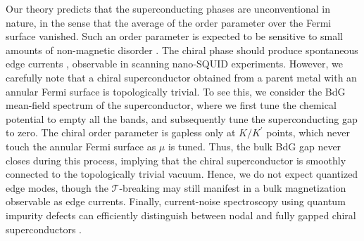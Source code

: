 \documentclass[aps,pra,twocolumn,superscriptaddress,10pt,article,nofootinbib,showpacs,longbibliography]{revtex4-1}
\begin{document}
Our theory predicts that the superconducting phases are unconventional in nature, in the sense that the average of the order parameter over the Fermi surface vanished. Such an order parameter is expected to be sensitive to small amounts of non-magnetic disorder \cite{Abrikosov,Larkin}. 
The chiral phase should produce  spontaneous edge currents \cite{Furusaki2001}, observable in scanning nano-SQUID experiments.
However, we carefully note that a chiral superconductor obtained from a parent metal with an annular Fermi surface is topologically trivial. 
To see this, we consider the BdG mean-field spectrum of the superconductor, where we first tune the chemical potential to empty all the bands, and subsequently tune the superconducting gap to zero. 
The chiral order parameter is gapless only at $K/K^\prime$ points, which never touch the annular Fermi surface as $\mu$ is tuned.
Thus, the bulk BdG gap never closes during this process, implying that the chiral superconductor is smoothly connected to the topologically trivial vacuum. 
Hence, we do not expect quantized edge modes, though the $\mathcal{T}$-breaking may still manifest in a bulk magnetization observable as edge currents.
Finally, current-noise spectroscopy using quantum impurity defects \cite{Agarwal2017} can efficiently distinguish between nodal and fully gapped chiral superconductors \cite{CD2021,DC2021}.
\end{document}
